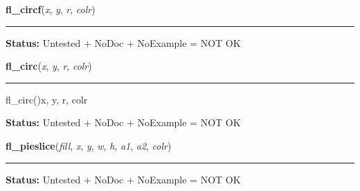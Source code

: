    \label{xformslib:library:fl_circf}

    \vspace{0.5ex}

\hspace{.8\funcindent}\begin{boxedminipage}{\funcwidth}

    \raggedright \textbf{fl\_circf}(\textit{x}, \textit{y}, \textit{r}, \textit{colr})

    \vspace{-1.5ex}

    \rule{\textwidth}{0.5\fboxrule}
\setlength{\parskip}{2ex}
\setlength{\parskip}{1ex}
\textbf{Status:} Untested + NoDoc + NoExample = NOT OK



    \end{boxedminipage}

    \label{xformslib:library:fl_circ}

    \vspace{0.5ex}

\hspace{.8\funcindent}\begin{boxedminipage}{\funcwidth}

    \raggedright \textbf{fl\_circ}(\textit{x}, \textit{y}, \textit{r}, \textit{colr})

    \vspace{-1.5ex}

    \rule{\textwidth}{0.5\fboxrule}
\setlength{\parskip}{2ex}
    fl\_circ()x, y, r, colr

\setlength{\parskip}{1ex}
\textbf{Status:} Untested + NoDoc + NoExample = NOT OK



    \end{boxedminipage}

    \label{xformslib:library:fl_pieslice}

    \vspace{0.5ex}

\hspace{.8\funcindent}\begin{boxedminipage}{\funcwidth}

    \raggedright \textbf{fl\_pieslice}(\textit{fill}, \textit{x}, \textit{y}, \textit{w}, \textit{h}, \textit{a1}, \textit{a2}, \textit{colr})

    \vspace{-1.5ex}

    \rule{\textwidth}{0.5\fboxrule}
\setlength{\parskip}{2ex}
\setlength{\parskip}{1ex}
\textbf{Status:} Untested + NoDoc + NoExample = NOT OK



    \end{boxedminipage}


